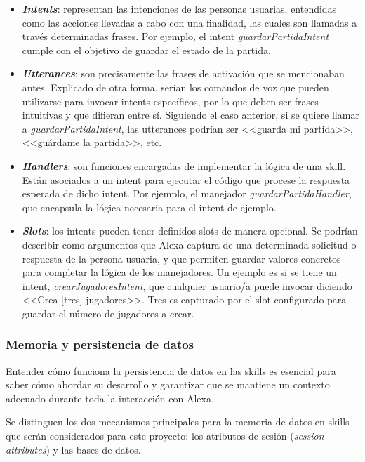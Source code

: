 \begin{itemize}
	\item \textit{\textbf{Intents}}: representan las intenciones de las personas usuarias, entendidas como las acciones llevadas a cabo con una finalidad, las cuales son llamadas a través determinadas frases. Por ejemplo, el intent \textit{guardarPartidaIntent} cumple con el objetivo de guardar el estado de la partida.
	\item \textit{\textbf{Utterances}}: son precisamente las frases de activación que se mencionaban antes. Explicado de otra forma, serían los comandos de voz que pueden utilizarse para invocar intents específicos, por lo que deben ser frases intuitivas y que difieran entre sí. Siguiendo el caso anterior, si se quiere llamar a \textit{guardarPartidaIntent}, las utterances podrían ser <<guarda mi partida>>, <<guárdame la partida>>, etc.
	\item \textit{\textbf{Handlers}}: son funciones encargadas de implementar la lógica de una skill. Están asociados a un intent para ejecutar el código que procese la respuesta esperada de dicho intent. Por ejemplo, el manejador \textit{guardarPartidaHandler}, que encapsula la lógica necesaria para el intent de ejemplo.
	\item \textit{\textbf{Slots}}: los intents pueden tener definidos slots de manera opcional. Se podrían describir como argumentos que Alexa captura de una determinada solicitud o respuesta de la persona usuaria, y que permiten guardar valores concretos para completar la lógica de los manejadores. Un ejemplo es si se tiene un intent, \textit{crearJugadoresIntent}, que cualquier usuario/a puede invocar diciendo <<Crea [tres] jugadores>>. Tres es capturado por el slot configurado para guardar el número de jugadores a crear.
\end{itemize}

\subsubsection{Memoria y persistencia de datos}

Entender cómo funciona la persistencia de datos en las skills es esencial para saber cómo abordar su desarrollo y garantizar que se mantiene un contexto adecuado durante toda la interacción con Alexa.

Se distinguen los dos mecanismos principales para la memoria de datos en skills que serán considerados para este proyecto: los atributos de sesión (\textit{session attributes}) y las bases de datos.

